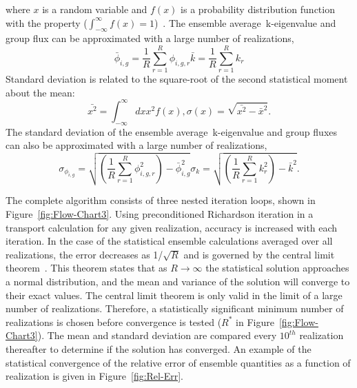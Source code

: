 	where ${x}$ is a random variable and ${f(x)}$ is a probability distribution function with the
	property (${\int_{-\infty}^{\infty}f(x) = 1}$)~\cite{Lew:93}.  The ensemble
	average~k-eigenvalue and group flux can be approximated with a large number of realizations, 
	\begin{subequations}
		\begin{equation}
			\bar{\phi}_{i,g} = \frac{1}{R} \sum^{R}_{r=1} \phi_{i,g,r}
		\end{equation}
		\begin{equation}
			\bar{k} = \frac{1}{R} \sum^{R}_{r=1} k_{r}
		\end{equation}	
		\label{eq:Mean}
	\end{subequations}
	Standard deviation is related to the square-root of the second statistical moment about the mean:
		\begin{subequations}
		\begin{equation}
			\bar{x^2} = \int_{-\infty}^{\infty} dx x^2 f(x),
		\end{equation}
		\begin{equation}
			\sigma{(x)} = \sqrt{\bar{x^2}-\bar{x}^2}.
		\end{equation}	
		\label{eq:Std-Dev-Def}
	\end{subequations}
	The standard deviation of the ensemble average~k-eigenvalue and group fluxes can also be
	approximated with a large number of realizations,
	\begin{subequations}
		\begin{equation}
			\sigma_{\phi_{i,g}} = \sqrt{\left(\frac{1}{R} \sum^{R}_{r=1} \phi_{i,g,r}^{2}\right) - \bar{\phi}_{i,g}^2}
		\end{equation}
		\begin{equation}
			\sigma_{k} = \sqrt{\left(\frac{1}{R}\sum^{R}_{r=1} k_{r}^{2}\right) - \bar{k}^2}.
		\end{equation}	
		\label{eq:Std-Dev}
	\end{subequations}

\noindent
	\indent The complete algorithm consists of three nested iteration loops, shown in
	Figure~\ref{fig:Flow-Chart3}.  Using preconditioned Richardson iteration in a transport calculation
	for any given 
	realization, accuracy is increased with each iteration.  In the case of the statistical ensemble
	calculations averaged over all realizations, the error decreases as 1/${\sqrt{R}}$ and is governed by
	the central limit theorem~\cite{Lew:93}.  This
	theorem states that as ${R \rightarrow \infty}$ the statistical solution approaches a normal distribution,
	and the mean and variance of the solution will converge to their exact values.  The central limit theorem
	is only valid in the limit of a large number of realizations.  Therefore, a statistically significant minimum
	number of realizations is chosen before convergence is tested (${R^*}$ in Figure~\ref{fig:Flow-Chart3}).
	The mean and standard deviation are compared every ${10^{th}}$ realization thereafter to 
	determine if the solution has converged.  An example of the statistical convergence of the relative error
	of ensemble quantities as a function of realization is given in Figure~\ref{fig:Rel-Err}.  
	
